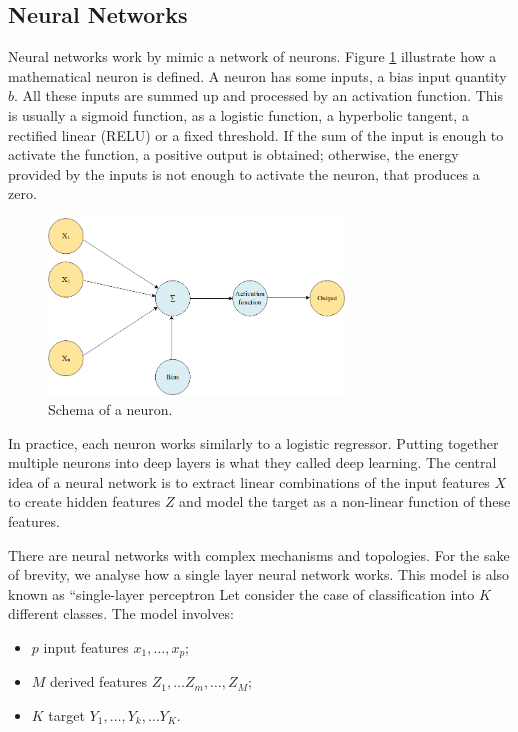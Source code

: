 \subsection{Neural Networks}
Neural networks work by mimic a network of neurons. Figure \ref{fig_neuron} illustrate how a mathematical neuron is defined. A neuron has some inputs, a bias input quantity $b$. All these inputs are summed up and processed by an activation function. This is usually a sigmoid function, as a logistic function, a hyperbolic tangent, a rectified linear (RELU) or a fixed threshold. If the sum of the input is enough to activate the function, a positive output is obtained; otherwise, the energy provided by the inputs is not enough to activate the neuron, that produces a zero.

\begin{figure}[hbt!]
\centering
\includegraphics[width=0.7\textwidth]{SectionLetsMath/nonLinearMethods_fig/fig_neuron.png}
\captionsetup{type=figure}
\caption{Schema of a neuron.}
\label{fig_neuron}
\end{figure}

In practice, each neuron works similarly to a logistic regressor. Putting together multiple neurons into deep layers is what they called deep learning. The central idea of a neural network is to extract linear combinations of the input features $X$ to create hidden features $Z$ and model the target as a non-linear function of these features. \par

There are neural networks with complex mechanisms and topologies. For the sake of brevity, we analyse how a single layer neural network works. This model is also known as “single-layer perceptron Let consider the case of classification into $K$ different classes. The model involves:

\begin{itemize}
    \item $p$ input features $x_1,\ldots,x_p$;
    \item $M$ derived features $Z_1,\ldots Z_m,\ldots,Z_M$;
    \item $K$ target $Y_1,\ldots,Y_k,\ldots Y_K$.
\end{itemize}

